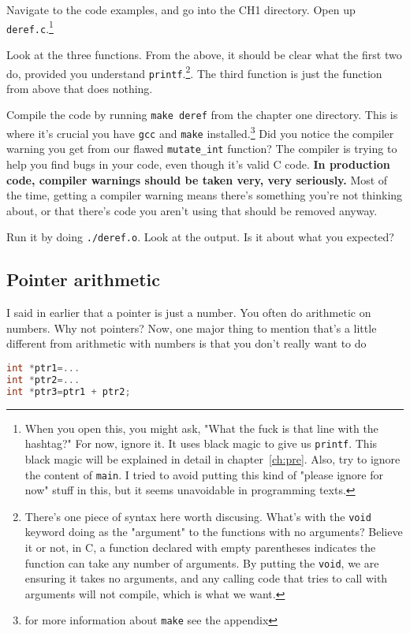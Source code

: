 \documentclass[ebook,11pt,oneside,openany]{memoir}
\begin{document}
Navigate to the code examples, and go into the CH1 directory. Open up \texttt{deref.c}.\footnote{When you open this, you might ask, "What the fuck is that line with the hashtag?" For now, ignore it. It uses black magic to give us \texttt{printf}. This black magic will be explained in detail in chapter~\ref{ch:pre}. Also, try to ignore the content of \texttt{main}. I tried to avoid putting this kind of "please ignore for now" stuff in this, but it seems unavoidable in programming texts.}

Look at the three functions. From the above, it should be clear what the first two do, provided you understand \texttt{printf}.\footnote{There's one piece of syntax here worth discusing. What's with the \texttt{void} keyword doing as the "argument" to the functions with no arguments? Believe it or not, in C, a function declared with empty parentheses indicates the function can take any number of arguments. By putting the \texttt{void}, we are ensuring it takes no arguments, and any calling code that tries to call with arguments will not compile, which is what we want.}. The third function is just the function from above that does nothing.

Compile the code by running \texttt{make deref} from the chapter one directory. This is where it's crucial you have \texttt{gcc} and \texttt{make} installed.\footnote{for more information about \texttt{make} see the appendix} Did you notice the compiler warning you get from our flawed \texttt{mutate\_int} function? The compiler is trying to help you find bugs in your code, even though it's valid C code. \textbf{In production code, compiler warnings should be taken very, very seriously.} Most of the time, getting a compiler warning means there's something you're not thinking about, or that there's code you aren't using that should be removed anyway.

Run it by doing \texttt{./deref.o}. Look at the output. Is it about what you expected?

\subsection{Pointer arithmetic}

I said in earlier that a pointer is just a number. You often do arithmetic on numbers. Why not pointers? Now, one major thing to mention that's a little different from arithmetic with numbers is that you don't really want to do 

\begin{lstlisting}[language=C]
int *ptr1=...
int *ptr2=...
int *ptr3=ptr1 + ptr2;
\end{lstlisting}
\end{document}
